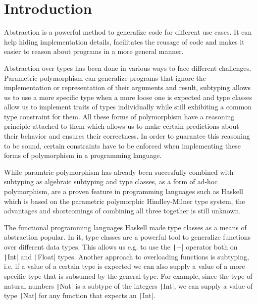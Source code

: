 
\chapter{Introduction}\label{ch:intro}

Abstraction is a powerful method to generalize code for different use cases.
It can help hiding implementation details, facilitates the reusage of code and makes it easier to reason about programs in a more general manner.

Abstraction over types has been done in various ways to face different challenges.
Parametric polymorphism can generalize programs that ignore the implementation or representation of their arguments and result,
subtyping allows us to use a more specific type when a more loose one is expected
and type classes allow us to implement traits of types individually while still exhibiting a common type constraint for them.
All these forms of polymorphism have a reasoning principle attached to them which allows us to make certain predictions about their behavior and ensures their correctness.
In order to guarantee this reasoning to be sound, certain constraints have to be enforced when implementing these forms of polymorphism in a programming language.

While paramtric polymorphism has already been succesfully combined with subtyping as algebraic subtyping \cite{dolan2017subtyping}
and type classes, as a form of ad-hoc polymorphism, are a proven feature in programming languages such as Haskell \cite{wadlerblott} which is based on the parametric polymorphic Hindley-Milner type system,
the advantages and shortcomings of combining all three together is still unknown.

The functional programming languages Haskell made type classes as a means of abstraction popular.
In it, type classes are a powerful tool to generalize functions over different data types.
This allows us e.g. to use the \texttt|+| operator both on \texttt|Int| and \texttt|Float| types.
Another approach to overloading functions is subtyping, i.e. if a value of a certain type is expected we can also supply a value of a more specific type that is subsumed by the general type.
For example, since the type of natural numbers \texttt|Nat| is a subtype of the integers \texttt|Int|, we can supply a value of type \texttt|Nat| for any function that expects an \texttt|Int|.

